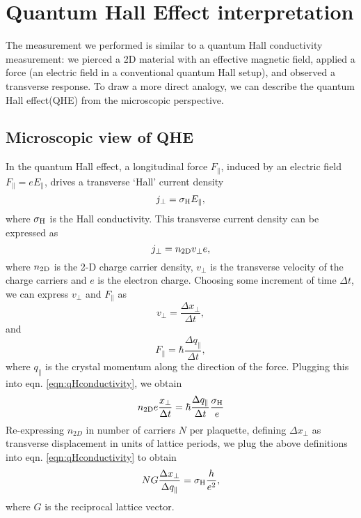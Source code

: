 \section{Quantum Hall Effect interpretation}\label{sec:qh}

The measurement we performed is similar to a quantum Hall conductivity measurement: we pierced a 2D material with an effective magnetic field, applied a force (an electric field in a conventional quantum Hall setup), and observed a transverse response. To draw a more direct analogy, we can describe the quantum Hall effect(QHE) from the microscopic perspective. 

\subsection{Microscopic view of QHE}
In the quantum Hall effect, a longitudinal force $F_{\parallel}$, induced by an electric field $F_{\parallel}=e E_{\parallel}$, drives a transverse \lq{Hall}\rq{} current density 
\begin{equation}
j_{\perp} = \sigma_{\rm{H}} E_{\parallel},
\label{eqn:qHconductivity}
\end{equation}
where $\sigma_{\rm{H}}$ is the Hall conductivity.  This transverse current density can be expressed as 
\begin{equation}
j_{\perp}=n_{2\rm{D}}v_{\perp}e,
\end{equation}
where $n_{2\rm{D}}$ is the 2-D charge carrier density, $v_{\perp}$ is the transverse velocity of the charge carriers and $e$ is the electron charge. Choosing some increment of time $\Delta t$, we can express $v_{\perp}$ and $F_{\parallel}$ as 
\begin{equation}
v_{\perp}=\frac{\Delta x_{\perp}}{\Delta t},
\end{equation}
and 
\begin{equation}
F_{\parallel} = \hbar \frac{\Delta q_{\parallel}}{\Delta t},
\end{equation}
where $q_{\parallel}$ is the crystal momentum along the direction of the force. Plugging this into eqn. \ref{eqn:qHconductivity}, we obtain
\begin{equation}
n_{2{\rm D}} e  \frac{x_{\perp}}{\Delta t} = \hbar \frac{\Delta q_{\parallel}}{\Delta t} \frac{\sigma_{\rm H}}{e}
\end{equation}
 Re-expressing $n_{2D}$ in number of carriers $N$ per plaquette, defining $\Delta x_{\perp}$ as transverse displacement in units of lattice periods, we plug the above definitions into eqn. \ref{eqn:qHconductivity} to obtain
\begin{equation}
N G\frac{\Delta x_{\perp}}{\Delta q_{\parallel}}=\sigma_{\rm{H}} \frac{h}{e^2},
\label{eqn:qHconductivityMicro}
\end{equation}
where $G$ is the reciprocal lattice vector. 

